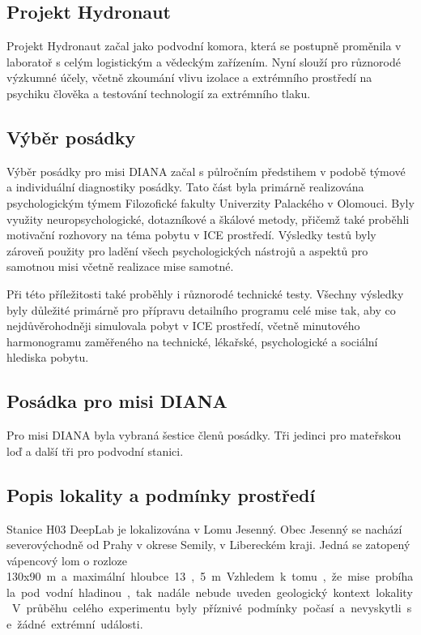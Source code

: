 \subsection{Projekt Hydronaut}
\label{subsec:projekt_hydronaut}
Projekt Hydronaut začal jako podvodní komora, která se postupně proměnila v
laboratoř s celým logistickým a vědeckým zařízením. Nyní slouží pro různorodé
výzkumné účely, včetně zkoumání vlivu izolace a extrémního prostředí na psychiku
člověka a testování technologií za extrémního tlaku. 

\subsection{Výběr posádky}
\label{subsec:vyber_posadky}
Výběr posádky pro misi DIANA začal s půlročním předstihem v podobě týmové a
individuální diagnostiky posádky. Tato část byla primárně realizována
psychologickým týmem Filozofické fakulty Univerzity Palackého v Olomouci. Byly
využity neuropsychologické, dotazníkové a škálové metody, přičemž také proběhli
motivační rozhovory na téma pobytu v ICE prostředí. Výsledky testů byly zároveň
použity pro ladění všech psychologických nástrojů a aspektů pro samotnou misi
včetně realizace mise samotné. 

Při této příležitosti také proběhly i různorodé technické testy. Všechny
výsledky byly důležité primárně pro přípravu detailního programu celé mise tak,
aby co nejdůvěrohodněji simulovala pobyt v ICE prostředí, včetně minutového
harmonogramu zaměřeného na technické, lékařské, psychologické a sociální
hlediska pobytu. 

\subsection{Posádka pro misi DIANA}
Pro misi DIANA byla vybraná šestice členů posádky. Tři jedinci pro mateřskou loď
a další tři pro podvodní stanici. 

\subsection{Popis lokality a podmínky prostředí}
\label{subsec:diana_lokalita}
Stanice H03 DeepLab je lokalizována v Lomu Jesenný. Obec Jesenný se nachází
severovýchodně od Prahy v okrese Semily, v Libereckém kraji. Jedná se zatopený
vápencový lom o rozloze 130x90~\si\meter~a maximální hloubce 13,5~\si\meter.
Vzhledem k tomu, že mise probíhala pod vodní hladinou, tak nadále nebude uveden
geologický kontext lokality. V průběhu celého experimentu byly příznivé podmínky
počasí a nevyskytli se žádné extrémní události. 

